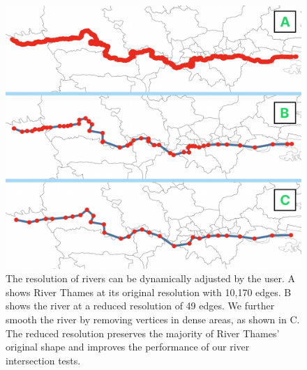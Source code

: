     {
        \begin{figure}[tb!]
            \centering
            \includegraphics[width=\columnwidth]{figure/river_resolution.png}
            \caption{The resolution of rivers can be dynamically adjusted by the user. A shows River Thames at its original resolution with 10,170 edges. B shows the river at a reduced resolution of 49 edges. We further smooth the river by removing vertices in dense areas, as shown in C. The reduced resolution preserves the majority of River Thames' original shape and improves the performance of our river intersection tests.}
            \label{fig:river resolution}
        \end{figure}
    }

